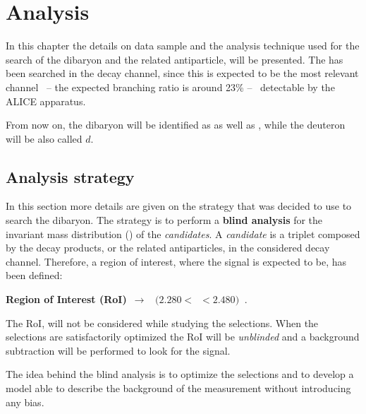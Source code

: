 %
\chapter{Analysis}
\label{sec:4}


In this chapter the details on data sample and the analysis technique used for the search of the \dst
dibaryon and the related antiparticle, will be presented. 
The \dst has been searched in the \dstdecay decay channel, since this is expected to be the
most relevant channel \ -- the expected branching ratio is around 23\% -- \ detectable by the
ALICE apparatus.

From now on, the \dst dibaryon will be identified as \ds as well as \dst, while the deuteron
will be also called $d$.

%
%
\section{Analysis strategy} \label{sec:4.1}

In this section more details are given on the strategy that was decided to use to search the
\dst dibaryon. 
The strategy is to perform a \textbf{blind analysis} for the invariant mass distribution
(\minv) of the \dst \textit{candidates}. A \ds \textit{candidate} is a triplet composed 
by the \ds decay products, or the related antiparticles, in the considered decay channel.
Therefore, a region of interest, where the \ds signal is expected to be, has been defined:
\begin{center}
\textbf{Region of Interest (RoI)}\  $\rightarrow$ \  $(2.280  < $\ \minv$  < 2.480)\ $ \gevcs.
\end{center}
The RoI, will not be considered while studying the selections.
When the selections are satisfactorily optimized the RoI will be \textit{unblinded} and a
background subtraction will be performed to look for the signal.

The idea behind the blind analysis is to optimize the selections and to develop a model
able to describe the background of the measurement without introducing any bias. 

